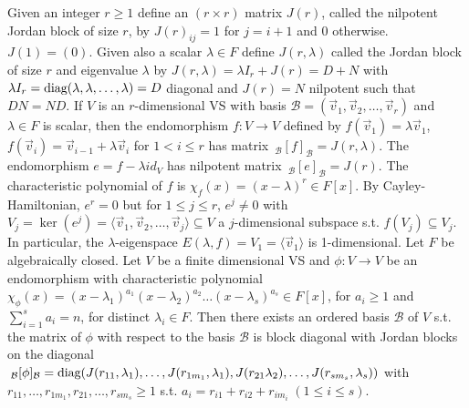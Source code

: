 Given an integer $r \ge 1$ define an $(r \times r)$ matrix $J(r)$, called the nilpotent Jordan block of size $r$, by $J(r)_{ij} = 1$ for $j = i + 1$ and $0$ otherwise. $J(1) = (0)$. Given also a scalar $\lambda \in F$ define $J(r, \lambda)$ called the Jordan block of size $r$ and eigenvalue $\lambda$ by $J(r, \lambda) = \lambda I_r + J(r) = D + N$ with $\lambda I_r = \text{diag}(\lambda, \lambda, \dots, \lambda) = D$ diagonal and $J(r) = N$ nilpotent such that $DN = ND$. If $V$ is an $r$-dimensional VS with basis $\mathcal{B} = (\vec{v}_1, \vec{v}_2, \dots, \vec{v}_r)$ and $\lambda \in F$ is scalar, then the endomorphism $f : V \to V$ defined by $f(\vec{v}_1) = \lambda \vec{v}_1$, $f(\vec{v}_i) = \vec{v}_{i-1} + \lambda \vec{v}_i$ for $1 < i \le r$ has matrix $\,_{\mathcal{B}}[f]_{\mathcal{B}} = J(r, \lambda)$. The endomorphism $e = f - \lambda id_V$ has nilpotent matrix $\,_{\mathcal{B}}[e]_{\mathcal{B}} = J(r)$. The characteristic polynomial of $f$ is $\chi_f(x) = (x - \lambda)^r \in F[x]$. By Cayley-Hamiltonian, $e^r = 0$ but for $1 \le j \le r$, $e^j \ne 0$ with $V_j = \ker(e^j) = \langle \vec{v}_1, \vec{v}_2, \dots, \vec{v}_j \rangle \subseteq V$ a $j$-dimensional subspace s.t. $f(V_j) \subseteq V_j$. In particular, the $\lambda$-eigenspace $E(\lambda, f) = V_1 = \langle \vec{v}_1 \rangle$ is 1-dimensional.
 Let $F$ be algebraically closed. Let $V$ be a finite dimensional VS and $\phi : V \to V$ be an endomorphism with characteristic polynomial $\chi_{\phi}(x) = (x - \lambda_1)^{a_1}(x - \lambda_2)^{a_2} \dots (x - \lambda_s)^{a_s} \in F[x]$, for $a_i \ge 1$ and $\sum_{i=1}^s a_i = n$, for distinct $\lambda_i \in F$. Then there exists an ordered basis $\mathcal{B}$ of $V$ s.t. the matrix of $\phi$ with respect to the basis $\mathcal{B}$ is block diagonal with Jordan blocks on the diagonal $\,_{\mathcal{B}}[\phi]_{\mathcal{B}} = \text{diag}(J(r_{11}, \lambda_1), \dots, J(r_{1m_1}, \lambda_1), J(r_{21}\lambda_2), \dots, J(r_{sm_s}, \lambda_s))$ with $r_{11}, \dots, r_{1m_1}, r_{21}, \dots, r_{sm_s} \ge 1$ s.t. $a_i = r_{i1} + r_{i2} + r_{im_i}\;(1 \le i \le s)$.